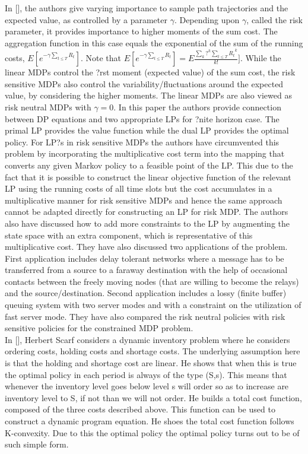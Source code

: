 \documentclass[10pt,a4paper,oneside]{report}
\begin{document}
In [], the authors give varying importance to sample path trajectories and the expected value, as controlled by a parameter $\gamma$. Depending upon $\gamma$, called the risk parameter, it provides importance to higher moments of the sum cost. The aggregation function in this case equals the exponential of the sum of the running costs, $E[e^{-\gamma {\sum_{t\leq T}R_t}} ]$. Note that $E[e^{-\gamma {\sum_{t\leq T}R_t}} ]= E\frac{\sum_k ?^k {\sum_{t\leq T}{R_t}}^{k}}{k!}]$. While the linear MDPs control the ?rst moment (expected value) of the sum cost, the risk sensitive MDPs also control the variability/fluctuations around the expected value, by considering the higher moments. The linear MDPs are also viewed as risk neutral MDPs with $\gamma=0$. In this paper the authors provide connection between DP equations and two appropriate LPs for ?nite horizon case. The primal LP provides the value function while the dual LP provides the optimal policy. For LP?s in risk sensitive MDPs the authors have circumvented this problem by incorporating the multiplicative cost term into the mapping that converts any given Markov policy to a feasible point of the LP. This due to the fact that it is possible to construct the linear objective function of the relevant LP using the running costs of all time slots but the cost accumulates in a multiplicative manner for risk sensitive MDPs and hence the same approach cannot be adapted directly for constructing an LP for risk MDP. The authors also have discussed how to add more constraints to the LP by augmenting the state space with an extra component, which is representative of this multiplicative cost. They have also discussed two applications of the problem. First application includes delay tolerant networks where a message has to be transferred from a source to a faraway destination with the help of occasional contacts between the freely moving nodes (that are willing to become the relays) and the source/destination. Second application includes a lossy (finite buffer) queuing system with two server modes and with a constraint on the utilization of fast server mode. They have also compared the risk neutral policies with risk sensitive policies for the constrained MDP problem.\\

In [], Herbert Scarf considers a dynamic inventory problem where he considers ordering costs, holding costs and shortage costs. The underlying assumption here is that the holding and shortage cost are linear. He shows that when this is true the optimal policy in each period is always of the type (S,s). This means that whenever the inventory level goes below level s will order so as to increase are inventory level to S, if not than we will not order. He builds a total cost function, composed of the three costs described above. This function can be used to construct a dynamic program equation. He shoes the total cost function follows K-convexity. Due to this the optimal policy the optimal policy turns out to be of such simple form.\\
\end{document}
